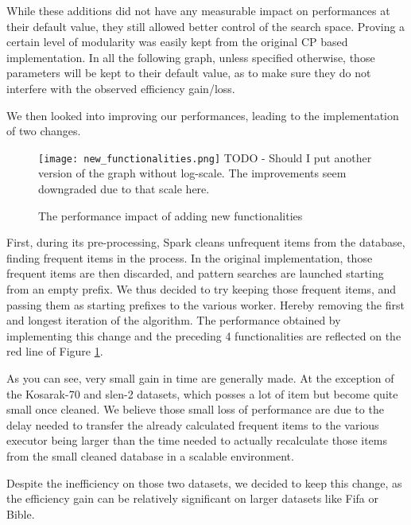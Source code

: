 \documentclass{eplmastersthesis}
\begin{document}
While these additions did not have any measurable impact on performances at their default value, they still allowed better control of the search space. Proving a certain level of modularity was easily kept from the original CP based implementation. In all the following graph, unless specified otherwise, those parameters will be kept to their default value, as to make sure they do not interfere with the observed efficiency gain/loss. \newline

We then looked into improving our performances, leading to the implementation of two changes. \newline

\begin{figure}[h]
  \centering
  \texttt{[image: new\_functionalities.png]}
  TODO - Should I put another version of the graph without log-scale. The improvements seem downgraded due to that scale here.
  \caption{The performance impact of adding new functionalities}
  \label{fig:new_functionalities_perf}
\end{figure}


First, during its pre-processing, Spark cleans unfrequent items from the database, finding frequent items in the process. In the original implementation, those frequent items are then discarded, and pattern searches are launched starting from an empty prefix. We thus decided to try keeping those frequent items, and passing them as starting prefixes to the various worker. Hereby removing the first and longest iteration of the algorithm. The performance obtained by implementing this change and the preceding 4 functionalities are reflected on the red line of Figure \ref{fig:new_functionalities_perf}.
\newline

As you can see, very small gain in time are generally made. At the exception of the Kosarak-70 and slen-2 datasets, which posses a lot of item but become quite small once cleaned. We believe those small loss of performance are due to the delay needed to transfer the already calculated frequent items to the various executor being larger than the time needed to actually recalculate those items from the small cleaned database in a scalable environment. \newline

Despite the inefficiency on those two datasets, we decided to keep this change, as the efficiency gain can be relatively significant on larger datasets like Fifa or Bible. \newline
\end{document}
